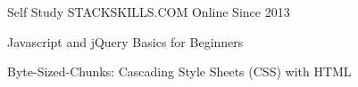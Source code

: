 \begin{cventries}
  \cventry
    {Self Study} %
    {STACKSKILLS.COM} %
    {Online} %
    {Since 2013} %
    {
      \begin{cvitems} %
		\item {Javascript and jQuery Basics for Beginners}
		\item {Byte-Sized-Chunks: Cascading Style Sheets (CSS) with HTML}
	  \end{cvitems}
    }

\end{cventries}
